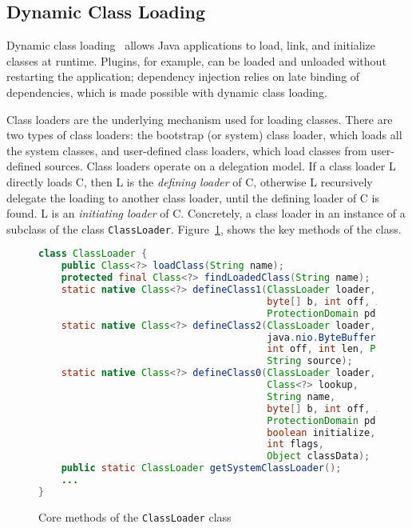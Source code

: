 \subsection{Dynamic Class Loading}
Dynamic class loading~\cite{liang_dynamic_nodate} allows Java applications to load, link, and initialize classes at runtime. Plugins, for example, can be loaded and unloaded without restarting the application; dependency injection relies on late binding of dependencies, which is made possible with dynamic class loading. 

Class loaders are the underlying mechanism used for loading classes. 
There are two types of class loaders: the bootstrap (or system) class loader, which loads all the system classes, and user-defined class loaders, which load classes from user-defined sources.
Class loaders operate on a delegation model. If a class loader L directly loads C, then L is the \emph{defining loader} of C, otherwise L recursively delegate the loading to another class loader, until the defining loader of C is found. L is an \emph{initiating loader} of C. 
Concretely, a class loader in an instance of a subclass of the class \verb|ClassLoader|. 
Figure~\ref{fig:classloader}, shows the key methods of the class.

\begin{figure}[ht]
    \centering
\begin{lstlisting}[language=Java]
class ClassLoader {
    public Class<?> loadClass(String name);
    protected final Class<?> findLoadedClass(String name);
    static native Class<?> defineClass1(ClassLoader loader, String name, 
                                        byte[] b, int off, int len,
                                        ProtectionDomain pd, String source);
    static native Class<?> defineClass2(ClassLoader loader, String name, 
                                        java.nio.ByteBuffer b,
                                        int off, int len, ProtectionDomain pd,
                                        String source);
    static native Class<?> defineClass0(ClassLoader loader,
                                        Class<?> lookup,
                                        String name,
                                        byte[] b, int off, int len,
                                        ProtectionDomain pd,
                                        boolean initialize,
                                        int flags,
                                        Object classData);
    public static ClassLoader getSystemClassLoader();
    ...
}
\end{lstlisting}
    \caption{Core methods of the \texttt{ClassLoader} class}
    \label{fig:classloader}
\end{figure}


